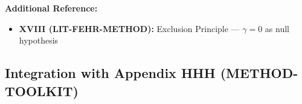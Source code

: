 \textbf{Additional Reference:}
\begin{itemize}[nosep]
    \item \textbf{XVIII (LIT-FEHR-METHOD):} Exclusion Principle --- $\gamma = 0$ as null hypothesis
\end{itemize}


\subsection{Integration with Appendix HHH (METHOD-TOOLKIT)}
\label{sec:av-hhh-integration}

